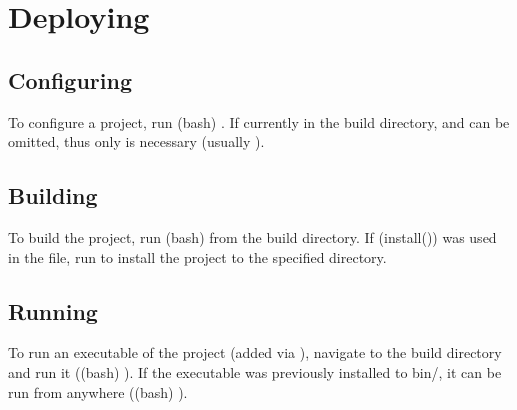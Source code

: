 \section{Deploying} \label{s:deploying}



\subsection{Configuring} \label{ss:deploying/configuring}
To configure a project, run (bash) .
If currently in the build directory,  and  can be omitted, thus only  is necessary (usually ). \\



\subsection{Building} \label{ss:deploying/building}
To build the project, run (bash)  from the build directory.
If \cmakebox(install()) was used in the  file, run  to install the project to the specified directory. \\



\subsection{Running} \label{ss:deploying/running}
To run an executable of the project (added via ), navigate to the build directory and run it ((bash) ).
If the executable was previously installed to bin/, it can be run from anywhere ((bash) ). \\

